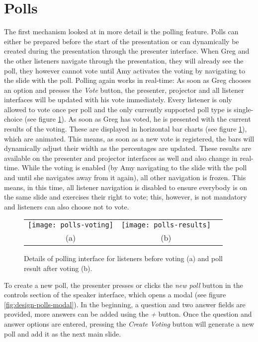 \section{Polls}
The first mechanism looked at in more detail is the polling feature. Polls can either be prepared before the start of the presentation or can dynamically be created during the presentation through the presenter interface. When Greg and the other listeners navigate through the presentation, they will already see the poll, they however cannot vote until Amy activates the voting by navigating to the slide with the poll. Polling again works in real-time: As soon as Greg chooses an option and presses the \emph{Vote} button, the presenter, projector and all listener interfaces will be updated with his vote immediately. Every listener is only allowed to vote once per poll and the only currently supported poll type is single-choice (see figure \ref{fig:design-polls}). As soon as Greg has voted, he is presented with the current results of the voting. These are displayed in horizontal bar charts (see figure \ref{fig:design-polls}), which are animated. This means, as soon as a new vote is registered, the bars will dynamically adjust their width as the percentages are updated. These results are available on the presenter and projector interfaces as well and also change in real-time.
While the voting is enabled (by Amy navigating to the slide with the poll and until she navigates away from it again), all other navigation is frozen. This means, in this time, all listener navigation is disabled to ensure everybody is on the same slide and exercises their right to vote; this, however, is not mandatory and listeners can also choose not to vote.

\begin{figure}
\centering
\begin{tabular}{ccc}
\texttt{[image: polls-voting]} &
\texttt{[image: polls-results]} \\
(a) & (b)
\end{tabular}
\caption{Details of polling interface for listeners before voting (a) and poll result after voting (b).}
\label{fig:design-polls}
\end{figure}

To create a new poll, the presenter presses or clicks the \emph{new poll} button in the controls section of the speaker interface, which opens a modal (see figure \ref{fig:design-polls-modal}). In the beginning, a question and two answer fields are provided, more answers can be added using the \emph{+} button. Once the question and answer options are entered, pressing the \emph{Create Voting} button will generate a new poll and add it as the next main slide.

